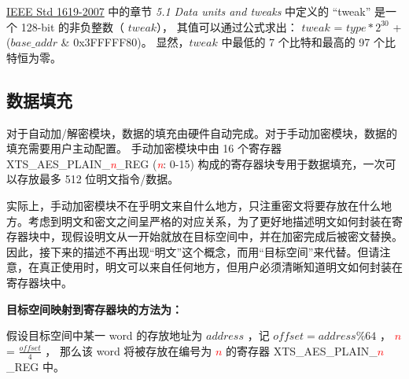 \documentclass[main\_\_CN.tex]{subfiles}
\begin{document}
\begin{tiplisting}
\vspace{-2em}
\begin{enumerate}
     \href{https://ieeexplore.ieee.org/document/4493450}{IEEE Std 1619-2007} 中的章节 \textit{5.1 Data units and tweaks} 中定义的 “tweak”  是一个 128-bit 的非负整数（ \begin{math} tweak \end{math}），
    其值可以通过公式求出： \begin{math} tweak \end{math} = \begin{math} type * 2^{30}\end{math} + (\begin{math} base\_addr \end{math} \& 0x{}3FFFFF80)。
    显然，\begin{math} tweak \end{math} 中最低的 7 个比特和最高的 97 个比特恒为零。
\end{enumerate}
\end{tiplisting}

\subsection{数据填充} \label{sec:extmemncr-data-writing}

对于自动加/解密模块，数据的填充由硬件自动完成。对于手动加密模块，数据的填充需要用户主动配置。
手动加密模块中由 16 个寄存器 XTS\_AES\_PLAIN\_\textcolor{red}{\it{n}}\_REG (\textcolor{red}{\it{n}}: 0-15) 构成的寄存器块专用于数据填充，一次可以存放最多 512 位明文指令/数据。

实际上，手动加密模块不在乎明文来自什么地方，只注重密文将要存放在什么地方。考虑到明文和密文之间呈严格的对应关系，为了更好地描述明文如何封装在寄存器块中，现假设明文从一开始就放在目标空间中，并在加密完成后被密文替换。因此，接下来的描述不再出现“明文”这个概念，而用“目标空间”来代替。但请注意，在真正使用时，明文可以来自任何地方，但用户必须清晰知道明文如何封装在寄存器块中。

{\bfseries 目标空间映射到寄存器块的方法为：}

假设目标空间中某一 word 的存放地址为 \begin{math} address \end{math} ，记  \begin{math} offset = address \% 64 \end{math} ，
    \textcolor{red}{\it{$n$}} =  \begin{math} \frac{offset}{4} \end{math} ，
    那么该 word 将被存放在编号为 \textcolor{red}{\it{$n$}} 的寄存器  XTS\_AES\_PLAIN\_\textcolor{red}{\it{$n$}}\_REG 中。
\end{document}
